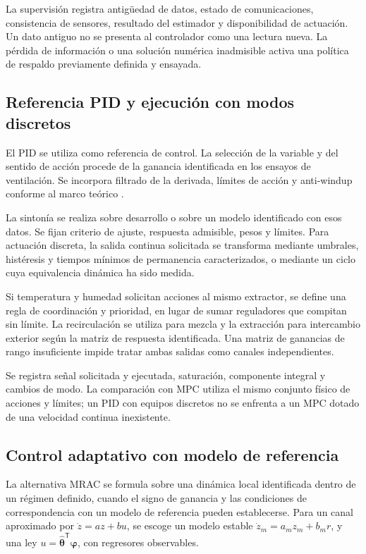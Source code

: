 La supervisión registra antigüedad de datos, estado de comunicaciones, consistencia de sensores, resultado del estimador y disponibilidad de actuación. Un dato antiguo no se presenta al controlador como una lectura nueva. La pérdida de información o una solución numérica inadmisible activa una política de respaldo previamente definida y ensayada.

\subsection{Referencia PID y ejecución con modos discretos}
\label{met:pid}

El PID se utiliza como referencia de control. La selección de la variable y del sentido de acción procede de la ganancia identificada en los ensayos de ventilación. Se incorpora filtrado de la derivada, límites de acción y anti-windup conforme al marco teórico \cite{astrom1995,astrom2008}.

La sintonía se realiza sobre desarrollo o sobre un modelo identificado con esos datos. Se fijan criterio de ajuste, respuesta admisible, pesos y límites. Para actuación discreta, la salida continua solicitada se transforma mediante umbrales, histéresis y tiempos mínimos de permanencia caracterizados, o mediante un ciclo cuya equivalencia dinámica ha sido medida.

Si temperatura y humedad solicitan acciones al mismo extractor, se define una regla de coordinación y prioridad, en lugar de sumar reguladores que compitan sin límite. La recirculación se utiliza para mezcla y la extracción para intercambio exterior según la matriz de respuesta identificada. Una matriz de ganancias de rango insuficiente impide tratar ambas salidas como canales independientes.

Se registra señal solicitada y ejecutada, saturación, componente integral y cambios de modo. La comparación con MPC utiliza el mismo conjunto físico de acciones y límites; un PID con equipos discretos no se enfrenta a un MPC dotado de una velocidad continua inexistente.

\subsection{Control adaptativo con modelo de referencia}
\label{met:mrac}

La alternativa MRAC se formula sobre una dinámica local identificada dentro de un régimen definido, cuando el signo de ganancia y las condiciones de correspondencia con un modelo de referencia pueden establecerse. Para un canal aproximado por $\dot z=az+bu$, se escoge un modelo estable $\dot z_m=a_mz_m+b_mr$, y una ley $u=\widehat{\boldsymbol\theta}^{\mathsf T}\boldsymbol\varphi$, con regresores observables.


